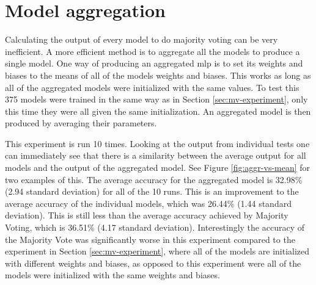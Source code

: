 \section{Model aggregation}

Calculating the output of every model to do majority voting can be very inefficient. A more efficient method is to aggregate all the models to produce a single model. One way of producing an aggregated \acrshort{mlp} is to set its weights and biases to the means of all of the models weights and biases. This works as long as all of the aggregated models were initialized with the same values. To test this 375 models were trained in the same way as in Section \ref{sec:mv-experiment}, only this time they were all given the same initialization. An aggregated model is then produced by averaging their parameters.

This experiment is run 10 times. Looking at the output from individual tests one can immediately see that there is a similarity between the average output for all models and the output of the aggregated model. See Figure \ref{fig:aggr-vs-mean} for two examples of this. The average accuracy for the aggregated model is 32.98\% (2.94 standard deviation) for all of the 10 runs. This is an improvement to the average accuracy of the individual models, which was 26.44\% (1.44 standard deviation). This is still less than the average accuracy achieved by Majority Voting, which is 36.51\% (4.17 standard deviation). Interestingly the accuracy of the Majority Vote was significantly worse in this experiment compared to the experiment in Section \ref{sec:mv-experiment}, where all of the models are initialized with different weights and biases, as opposed to this experiment were all of the models were initialized with the same weights and biases.

